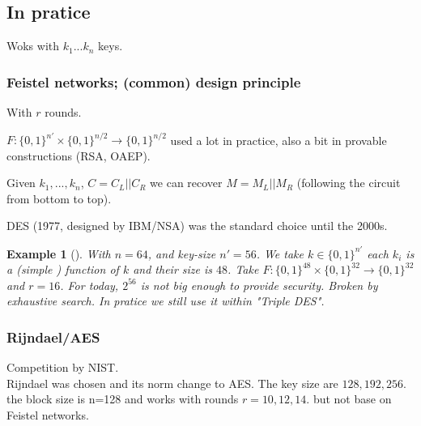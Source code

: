 \documentclass{article}
\newtheorem{ex}[thm]{Example}
\newcommand{\Ex}[3]{\begin{ex}[#1]\label{#2}#3\end{ex}}
\newcommand{\bit}{\{0,1\}}
\begin{document}
\subsection{In pratice}
Woks with $k_1...k_n$ keys.
\subsubsection{Feistel networks; (common) design principle}
\begin{center}

With $r$ rounds.
\end{center}
$F:\bit^{n'}\times\bit^{n/2} \rightarrow \bit^{n/2}$ used a lot in practice, also a bit in provable constructions (RSA, OAEP).

Given $k_1,...,k_n$, $C=C_L||C_R$ we can recover $M=M_L||M_R$ (following the circuit from bottom to top).

DES (1977, designed by IBM/NSA) was the standard choice until the 2000s.

\Ex{}{}{With $n=64$, and key-size $n'=56$. We take $k\in\bit^{n'}$ each $k_i$ is a (simple ) function of $k$ and their size is $48$.
Take $F:\bit^{48}\times\bit^{32} \rightarrow \bit^{32}$ and $r=16$. For today, $2^{56}$ is not big enough to provide security. Broken by exhaustive search. In pratice we still use it within "Triple DES".}

\subsubsection{Rijndael/AES}
Competition by NIST.\\
Rijndael was chosen and its norm change to AES. The key size are $128,192,256$. the block size is n=128 and works with rounds $r=10,12,14$. but not base on Feistel networks.
\end{document}
